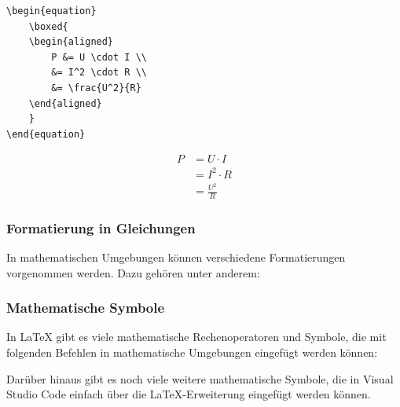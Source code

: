 \begin{minipage}{0.5\textwidth}
    \begin{lstlisting}[language={[LaTeX]TeX}]
\begin{equation}
    \boxed{
    \begin{aligned}
        P &= U \cdot I \\
        &= I^2 \cdot R \\
        &= \frac{U^2}{R}
    \end{aligned}
    }
\end{equation}
\end{lstlisting}
\end{minipage}
\hfill
\begin{minipage}{0.5\textwidth}
    \begin{equation}
        \boxed{
            \begin{aligned}
                P & = U \cdot I     \\
                  & = I^2 \cdot R   \\
                  & = \frac{U^2}{R}
            \end{aligned}
        }
    \end{equation}
\end{minipage}

\newpage

\subsubsection{Formatierung in Gleichungen}
In mathematischen Umgebungen können verschiedene Formatierungen vorgenommen werden. Dazu gehören unter anderem:



\vspace{0.5cm}

\subsubsection{Mathematische Symbole}
In \LaTeX{} gibt es viele mathematische Rechenoperatoren und Symbole, die mit folgenden Befehlen in mathematische Umgebungen eingefügt werden können:



Darüber hinaus gibt es noch viele weitere mathematische Symbole, die in Visual Studio Code einfach über die \LaTeX{}-Erweiterung eingefügt werden können.

